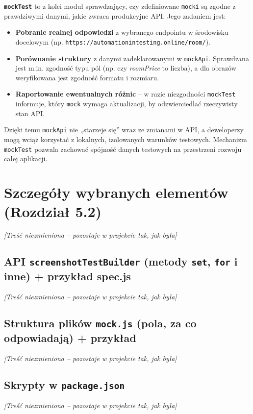 \documentclass[12pt]{report}
\begin{document}
\noindent \textbf{\texttt{mockTest}} to z kolei moduł sprawdzający, czy zdefiniowane \texttt{mocki} są zgodne z prawdziwymi danymi, jakie zwraca produkcyjne API. Jego zadaniem jest:
\begin{itemize}
    \item \textbf{Pobranie realnej odpowiedzi} z wybranego endpointu w środowisku docelowym (np. \texttt{https://automationintesting.online/room/}).
    \item \textbf{Porównanie struktury} z danymi zadeklarowanymi w \texttt{mockApi}. Sprawdzana jest m.in. zgodność typu pól (np. czy \emph{roomPrice} to liczba), a dla obrazów weryfikowana jest zgodność formatu i rozmiaru.
    \item \textbf{Raportowanie ewentualnych różnic} -- w razie niezgodności \texttt{mockTest} informuje, który \texttt{mock} wymaga aktualizacji, by odzwierciedlać rzeczywisty stan API.
\end{itemize}

\noindent Dzięki temu \texttt{mockApi} nie „starzeje się” wraz ze zmianami w API, a deweloperzy mogą wciąż korzystać z lokalnych, izolowanych warunków testowych. Mechanizm \texttt{mockTest} pozwala zachować spójność danych testowych na przestrzeni rozwoju całej aplikacji.

\section{Szczegóły wybranych elementów (Rozdział 5.2)}
\label{sec:szczegoly-wybranych-elementow}
\textit{[Treść niezmieniona – pozostaje w projekcie tak, jak była]}

\subsection{API \texttt{screenshotTestBuilder} (metody \texttt{set}, \texttt{for} i inne) + przykład spec.js}
\label{sec:api-screenshotTestBuilder}
\textit{[Treść niezmieniona – pozostaje w projekcie tak, jak była]}

\subsection{Struktura plików \texttt{mock.js} (pola, za co odpowiadają) + przykład}
\label{sec:struktura-mockjs}
\textit{[Treść niezmieniona – pozostaje w projekcie tak, jak była]}

\subsection{Skrypty w \texttt{package.json}}
\label{sec:skrypty-package}
\textit{[Treść niezmieniona – pozostaje w projekcie tak, jak była]}
\end{document}
